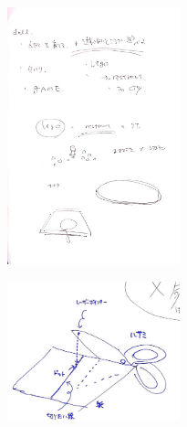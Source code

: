 \documentclass{funthesis}
\begin{document}
\begin{figure}[H]
 \begin{minipage}{0.47\hsize}
 \begin{center}
\includegraphics[width=50mm]{figures/group5.jpg}
 \end{center}
 \label{fig:seven}
 \end{minipage}
 \begin{minipage}{0.47\hsize}
 \begin{center}
 \includegraphics[width=50mm]{figures/group6.jpg}
 \end{center}
 \label{fig:eight}
 \end{minipage}
\end{figure}
\end{document}
